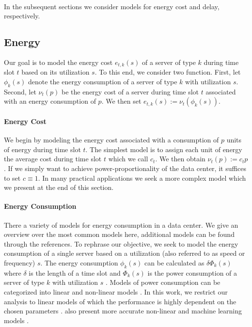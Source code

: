 \paragraph{}{In the subsequent sections we consider models for energy cost and delay, respectively.}

\subsection{Energy}\label{section:application:operating_cost:energy}

Our goal is to model the energy cost $e_{t,k}(s)$ of a server of type $k$ during time slot $t$ based on its utilization $s$. To this end, we consider two function. First, let $\phi_k(s)$ denote the energy consumption of a server of type $k$ with utilization $s$. Second, let $\nu_t(p)$ be the energy cost of a server during time slot $t$ associated with an energy consumption of $p$. We then set $e_{t,k}(s) := \nu_t(\phi_k(s))$.

\paragraph{Energy Cost} We begin by modeling the energy cost associated with a consumption of $p$ units of energy during time slot $t$. The simplest model is to assign each unit of energy the average cost during time slot $t$ which we call $c_t$. We then obtain $\nu_t(p) := c_t p$. If we simply want to achieve power-proportionality of the data center, it suffices to set $c \equiv 1$. In many practical applications we seek a more complex model which we present at the end of this section.

\paragraph{Energy Consumption} There a variety of models for energy consumption in a data center. We give an overview over the most common models here, additional models can be found through the references. To rephrase our objective, we seek to model the energy consumption of a single server based on a utilization (also referred to as speed or frequency) $s$. The energy consumption $\phi_k(s)$ can be calculated as $\delta \Phi_k(s)$ where $\delta$ is the length of a time slot and $\Phi_k(s)$ is the power consumption of a server of type $k$ with utilization $s$ \cite{Dayarathna2016}. Models of power consumption can be categorized into linear and non-linear models \cite{Ismail2020}. In this work, we restrict our analysis to linear models of which the performance is highly dependent on the chosen parameters \cite{Ismail2020}. \citeauthor*{Ismail2020} also present more accurate non-linear and machine learning models \cite{Ismail2020}.

